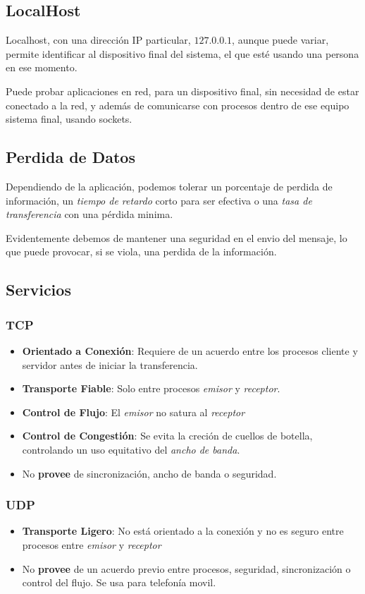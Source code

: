 \subsection{LocalHost}
\noindent Localhost, con una dirección IP particular, \(127.0.0.1\), aunque puede variar, permite identificar al dispositivo final del sistema, el que esté usando una persona en ese momento.\par \noindent Puede probar aplicaciones en red, para un dispositivo final, sin necesidad de estar conectado a la red, y además de comunicarse con procesos dentro de ese equipo sistema final, usando sockets.
\subsection{Perdida de Datos}
\noindent Dependiendo de la aplicación, podemos tolerar un porcentaje de perdida de información, un \textit{tiempo de retardo} corto para ser efectiva o una \textit{tasa de transferencia} con una pérdida minima.
\par \noindent Evidentemente debemos de mantener una seguridad en el envio del mensaje, lo que puede provocar, si se viola, una perdida de la información.
\subsection{Servicios}
\subsubsection{TCP}
\begin{itemize}
        \item \textbf{Orientado a Conexión}: Requiere de un acuerdo entre los procesos cliente y servidor antes de iniciar la transferencia.
        \item \textbf{Transporte Fiable}: Solo entre procesos \textit{emisor} y \textit{receptor}.
        \item \textbf{Control de Flujo}: El \textit{emisor} no satura al \textit{receptor}
        \item \textbf{Control de Congestión}: Se evita la creción de cuellos de botella, controlando un uso equitativo del \textit{ancho de banda}.
        \item No \textbf{provee} de sincronización, ancho de banda o seguridad.
\end{itemize}
\subsubsection{UDP}
\begin{itemize}
        \item \textbf{Transporte Ligero}: No está orientado a la conexión y no es seguro entre procesos entre \textit{emisor} y \textit{receptor}
        \item No \textbf{provee} de un acuerdo previo entre procesos, seguridad, sincronización o control del flujo. Se usa para telefonía movil.
\end{itemize}